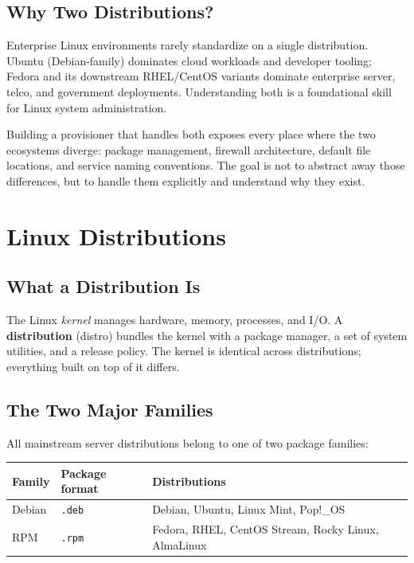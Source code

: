 \documentclass[11pt,a4paper]{article}
\begin{document}
\subsection{Why Two Distributions?}

Enterprise Linux environments rarely standardize on a single distribution. Ubuntu (Debian-family) dominates cloud workloads and developer tooling; Fedora and its downstream RHEL/CentOS variants dominate enterprise server, telco, and government deployments. Understanding both is a foundational skill for Linux system administration.

Building a provisioner that handles both exposes every place where the two ecosystems diverge: package management, firewall architecture, default file locations, and service naming conventions. The goal is not to abstract away those differences, but to handle them explicitly and understand why they exist.

\section{Linux Distributions}
\label{sec:distros}

\subsection{What a Distribution Is}

The Linux \emph{kernel} manages hardware, memory, processes, and I/O. A \textbf{distribution} (distro) bundles the kernel with a package manager, a set of system utilities, and a release policy. The kernel is identical across distributions; everything built on top of it differs.

\subsection{The Two Major Families}

All mainstream server distributions belong to one of two package families:

\begin{center}
\begin{tabular}{L{3cm}L{2.5cm}L{7cm}}
\toprule
\textbf{Family} & \textbf{Package format} & \textbf{Distributions} \\
\midrule
Debian     & \texttt{.deb} & Debian, Ubuntu, Linux Mint, Pop!\_OS \\
RPM        & \texttt{.rpm} & Fedora, RHEL, CentOS Stream, Rocky Linux, AlmaLinux \\
\bottomrule
\end{tabular}
\end{center}
\end{document}
